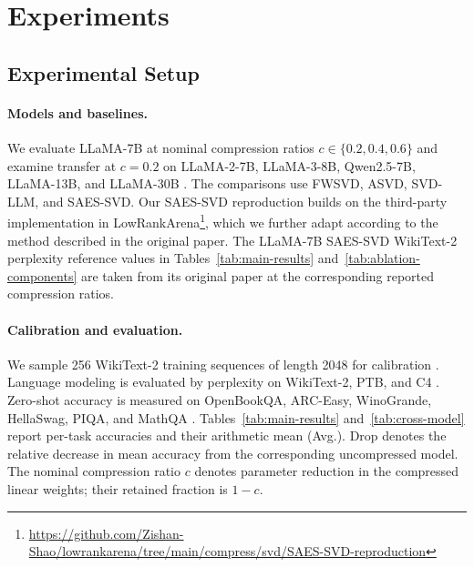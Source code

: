 \documentclass[11pt]{article}
\begin{document}
\section{Experiments}\label{sec:experiments}



\subsection{Experimental Setup}

\paragraph{Models and baselines.}
We evaluate LLaMA-7B at nominal compression ratios $c\in\{0.2,0.4,0.6\}$ and examine transfer at $c=0.2$ on LLaMA-2-7B, LLaMA-3-8B, Qwen2.5-7B, LLaMA-13B, and LLaMA-30B \citep{touvron2023llama,touvron2023llama2,dubey2024llama3,yang2024qwen25}. The comparisons use FWSVD, ASVD, SVD-LLM, and SAES-SVD. Our SAES-SVD reproduction builds on the third-party implementation in LowRankArena\footnote{\url{https://github.com/Zishan-Shao/lowrankarena/tree/main/compress/svd/SAES-SVD-reproduction}}, which we further adapt according to the method described in the original paper. The LLaMA-7B SAES-SVD WikiText-2 perplexity reference values in Tables~\ref{tab:main-results} and~\ref{tab:ablation-components} are taken from its original paper at the corresponding reported compression ratios.

\paragraph{Calibration and evaluation.}
We sample 256 WikiText-2 training sequences of length 2048 for calibration \citep{merity2017wikitext2}. Language modeling is evaluated by perplexity on WikiText-2, PTB, and C4 \citep{marcus1993ptb,raffel2020c4}. Zero-shot accuracy is measured on OpenBookQA, ARC-Easy, WinoGrande, HellaSwag, PIQA, and MathQA \citep{mihaylov2018openbook,clark2018think,sakaguchi2021winogrande,zellers2019hellaswag,bisk2020piqa,amini2019mathqa}. Tables~\ref{tab:main-results} and~\ref{tab:cross-model} report per-task accuracies and their arithmetic mean (Avg.). Drop denotes the relative decrease in mean accuracy from the corresponding uncompressed model. The nominal compression ratio $c$ denotes parameter reduction in the compressed linear weights; their retained fraction is $1-c$.
\end{document}
